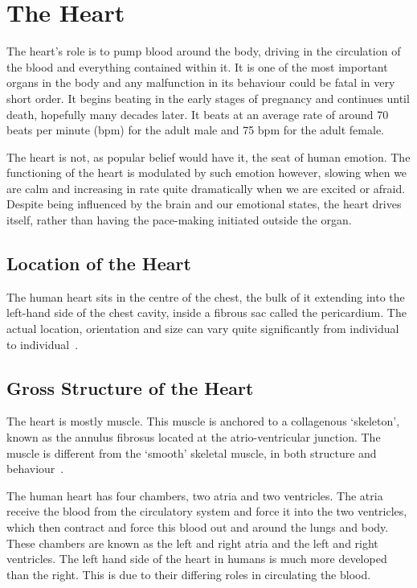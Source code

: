 \section{The Heart}

The heart's role is to pump blood around the body, driving in the circulation of
the blood and everything contained within it.  It is one of the most important
organs in the body and any malfunction in its behaviour could be fatal in very
short order.  It begins beating in the early stages of pregnancy and continues
until death, hopefully many decades later.  It beats at an average rate of
around 70 beats per minute (bpm) for the adult male and 75 bpm for the adult
female.

The heart is not, as popular belief would have it, the seat of human emotion.
The functioning of the heart is modulated by such emotion however, slowing when
we are calm and increasing in rate quite dramatically when we are excited or
afraid.  Despite being influenced by the brain and our emotional states, the
heart drives itself, rather than having the pace-making initiated outside the
organ.

\subsection{Location of the Heart}

The human heart sits in the centre of the chest, the bulk of it extending into the
left-hand side of the chest cavity, inside a fibrous sac called the pericardium.
The actual location, orientation and size can vary quite significantly from
individual to individual~\cite{Oberman1967}.


\subsection{Gross Structure of the Heart}

The heart is mostly muscle.
This muscle is anchored to a collagenous `skeleton', known as the annulus
fibrosus located at the atrio-ventricular junction.
The muscle is different from the `smooth' skeletal muscle, in both structure
and behaviour~\cite{Katz2006}.

The human heart has four chambers, two atria and two ventricles.  The atria receive
the blood from the circulatory system and force it into the two ventricles,
which then contract and force this blood out and around the lungs and body.
These chambers are known as the left and right atria and the left and right
ventricles.  The left hand side of the heart in humans is much more developed
than the right.
This is due to their differing roles in circulating the blood.

